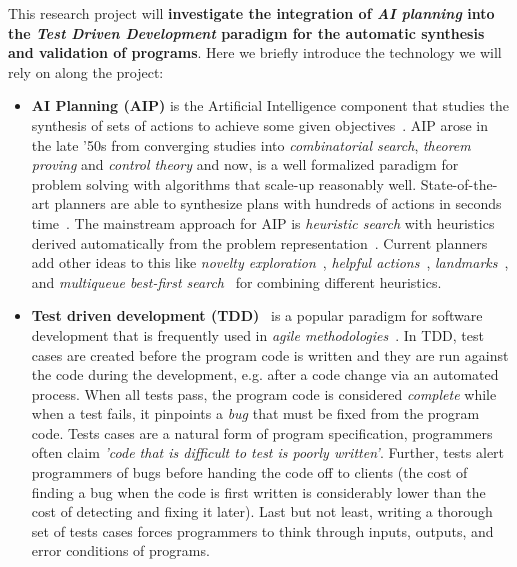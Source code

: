 \documentclass[10pt,a4paper]{paper}
\begin{document}
This research project will {\bf investigate the integration of {\em AI planning} into the {\em Test Driven Development} paradigm for the automatic synthesis and validation of programs}. Here we briefly introduce the technology we will rely on along the project:
\begin{itemize}
\item {\bf AI Planning (AIP)} is the Artificial Intelligence component that studies the synthesis of sets of actions to achieve some given objectives~\cite{ghallab2004automated}. AIP arose in the late ’50s from converging studies into {\em combinatorial search}, {\em theorem proving} and {\em control theory} and now, is a well formalized paradigm for problem solving with algorithms that scale-up reasonably well. State-of-the-art planners are able to synthesize plans with hundreds of actions in seconds time~\cite{geffner2013concise}.  The mainstream approach for AIP is {\em heuristic search} with heuristics derived automatically from the problem representation~\cite{mcdermott1996heuristic,bonet2001planning}.  Current planners add other ideas to this like {\it novelty exploration}~\cite{geffner:psimulators:IJCAI17}, {\it helpful actions}~\cite{hoffmann2001ff}, {\it landmarks}~\cite{helmert2006fast}, and {\it multiqueue best-first search}~\cite{richter2010lama} for combining different heuristics.
  
\item {\bf Test driven development (TDD)}~\cite{beck:TDD:2003} is a popular paradigm for software development that is frequently used in {\it agile methodologies}~\cite{cohen2003agile}. In TDD, test cases are created before the program code is written and they are run against the code during the development, e.g. after a code change via an automated process. When all tests pass, the program code is considered {\em complete} while when a test fails, it pinpoints a {\em bug} that must be fixed from the program code. Tests cases are a natural form of program specification, programmers often claim {\em 'code that is difficult to test is poorly written'}. Further, tests alert programmers of bugs before handing the code off to clients (the cost of finding a bug when the code is first written is considerably lower than the cost of detecting and fixing it later). Last but not least, writing a thorough set of tests cases forces programmers to think through inputs, outputs, and error conditions of programs. 
\end{itemize}
\end{document}
